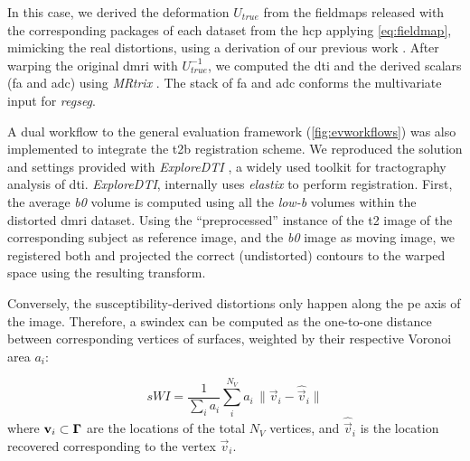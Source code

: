 In this case, we derived the deformation $U_{true}$ from the fieldmaps released with
  the corresponding packages of each dataset from the \gls*{hcp} applying \eqref{eq:fieldmap},
  mimicking the real distortions, using a derivation of our previous work
  \citep{esteban_simulationbased_2014}.
After warping the original \gls*{dmri} with $U_{true}^{-1}$, we computed the \gls*{dti} and
  the derived scalars (\gls*{fa} and \gls*{adc}) using \emph{MRtrix} \citep{tournier_mrtrix_2012}.
The stack of \gls*{fa} and \gls*{adc} conforms the multivariate input for \emph{regseg}.

A dual workflow to the general evaluation framework (\autoref{fig:evworkflows})
  was also implemented to integrate the \gls*{t2b} registration scheme.
We reproduced the solution and settings provided with \emph{ExploreDTI}
  \citep{leemans_exploredti_2009}, a widely used toolkit for tractography analysis of
  \gls*{dti}.
\emph{ExploreDTI}, internally uses \emph{elastix} \citep{klein_elastix_2010} to
  perform registration.
First, the average \emph{b0} volume is computed using all the \emph{low-b} volumes within
  the distorted \gls*{dmri} dataset.
Using the ``preprocessed'' instance of the \gls*{t2} image of the corresponding subject as
  reference image, and the \emph{b0} image as moving image, we registered both and
  projected the correct (undistorted) contours to the warped space using the resulting
  transform.

Conversely, the susceptibility-derived distortions only happen along the \gls*{pe}
  axis of the image.
Therefore, a \gls*{swindex} can be computed as the one-to-one distance between corresponding
  vertices of surfaces, weighted by their respective Voronoi area $a_i$:

  \begin{equation}
  sWI = \frac{1}{\sum_i a_i} \sum\limits_i^{N_V} a_i\,\|
  \vec{v}_i - \hat{\vec{v}}_i \|
  \label{eq:swindex}
  \end{equation}
%
  where $\mathbf{v}_i \subset \boldsymbol{\Gamma}$ are the locations of the total $N_V$ vertices, and $\hat{\vec{v}}_i$ is the location
  recovered corresponding to the vertex $\vec{v}_i$.